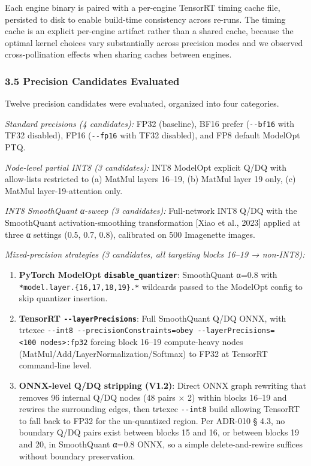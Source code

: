 \documentclass[
]{article}
\providecommand{\tightlist}{%
  \setlength{\itemsep}{0pt}\setlength{\parskip}{0pt}}
\begin{document}
Each engine binary is paired with a per-engine TensorRT timing cache
file, persisted to disk to enable build-time consistency across re-runs.
The timing cache is an explicit per-engine artifact rather than a shared
cache, because the optimal kernel choices vary substantially across
precision modes and we observed cross-pollination effects when sharing
caches between engines.

\subsubsection{3.5 Precision Candidates
Evaluated}\label{35-precision-candidates-evaluated}

Twelve precision candidates were evaluated, organized into four
categories.

\emph{Standard precisions (4 candidates):} FP32 (baseline), BF16 prefer
(\texttt{-\/-bf16} with TF32 disabled), FP16 (\texttt{-\/-fp16} with
TF32 disabled), and FP8 default ModelOpt PTQ.

\emph{Node-level partial INT8 (3 candidates):} INT8 ModelOpt explicit
Q/DQ with allow-lists restricted to (a) MatMul layers 16--19, (b) MatMul
layer 19 only, (c) MatMul layer-19-attention only.

\emph{INT8 SmoothQuant α-sweep (3 candidates):} Full-network INT8 Q/DQ
with the SmoothQuant activation-smoothing transformation {[}Xiao et al.,
2023{]} applied at three α settings (0.5, 0.7, 0.8), calibrated on 500
Imagenette images.

\emph{Mixed-precision strategies (3 candidates, all targeting blocks
16--19 → non-INT8):}

\begin{enumerate}
\def\labelenumi{\arabic{enumi}.}
\tightlist
\item
  \textbf{PyTorch ModelOpt \texttt{disable\_quantizer}}: SmoothQuant
  α=0.8 with \texttt{*model.layer.\{16,17,18,19\}.*} wildcards passed to
  the ModelOpt config to skip quantizer insertion.
\item
  \textbf{TensorRT \texttt{-\/-layerPrecisions}}: Full SmoothQuant Q/DQ
  ONNX, with trtexec
  \texttt{-\/-int8\ -\/-precisionConstraints=obey\ -\/-layerPrecisions=\textless{}100\ nodes\textgreater{}:fp32}
  forcing block 16--19 compute-heavy nodes
  (MatMul/Add/LayerNormalization/Softmax) to FP32 at TensorRT
  command-line level.
\item
  \textbf{ONNX-level Q/DQ stripping (V1.2)}: Direct ONNX graph rewriting
  that removes 96 internal Q/DQ nodes (48 pairs × 2) within blocks
  16--19 and rewires the surrounding edges, then trtexec
  \texttt{-\/-int8} build allowing TensorRT to fall back to FP32 for the
  un-quantized region. Per ADR-010 § 4.3, no boundary Q/DQ pairs exist
  between blocks 15 and 16, or between blocks 19 and 20, in SmoothQuant
  α=0.8 ONNX, so a simple delete-and-rewire suffices without boundary
  preservation.
\end{enumerate}
\end{document}
